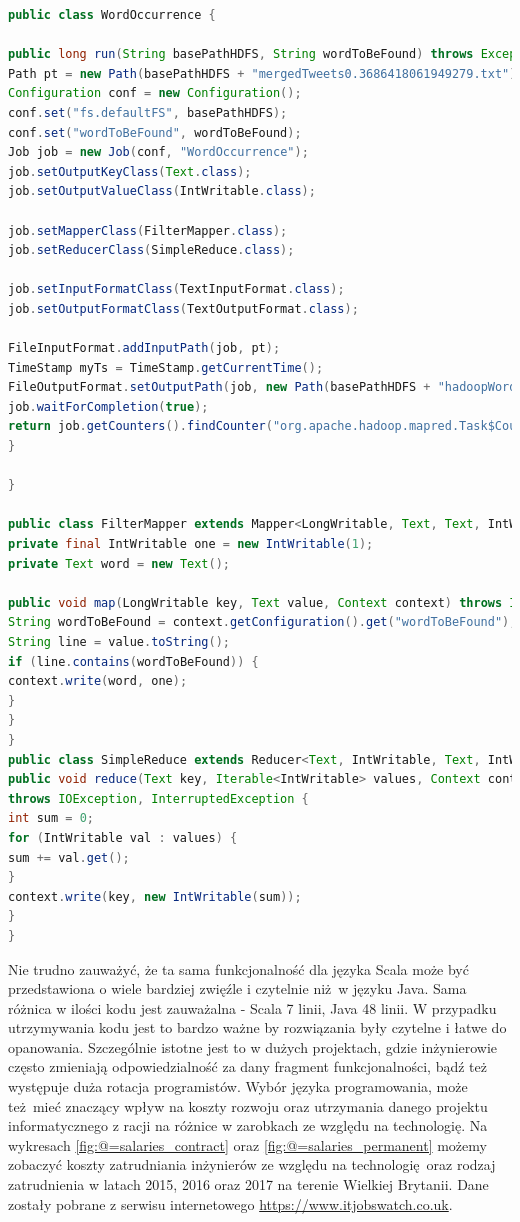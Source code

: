 \begin{lstlisting}[language=Java, caption={Operacja zliczania wystąpień danej frazy w linii dla języka Java na platformie Apache Hadoop},captionpos=b, label={lst:java-occurrence-listing}]
public class WordOccurrence {

public long run(String basePathHDFS, String wordToBeFound) throws Exception {
Path pt = new Path(basePathHDFS + "mergedTweets0.3686418061949279.txt");
Configuration conf = new Configuration();
conf.set("fs.defaultFS", basePathHDFS);
conf.set("wordToBeFound", wordToBeFound);
Job job = new Job(conf, "WordOccurrence");
job.setOutputKeyClass(Text.class);
job.setOutputValueClass(IntWritable.class);

job.setMapperClass(FilterMapper.class);
job.setReducerClass(SimpleReduce.class);

job.setInputFormatClass(TextInputFormat.class);
job.setOutputFormatClass(TextOutputFormat.class);

FileInputFormat.addInputPath(job, pt);
TimeStamp myTs = TimeStamp.getCurrentTime();
FileOutputFormat.setOutputPath(job, new Path(basePathHDFS + "hadoopWordOccurrenceResult" + myTs));
job.waitForCompletion(true);
return job.getCounters().findCounter("org.apache.hadoop.mapred.Task$Counter", "MAP_OUTPUT_RECORDS").getValue();
}

}

public class FilterMapper extends Mapper<LongWritable, Text, Text, IntWritable> {
private final IntWritable one = new IntWritable(1);
private Text word = new Text();

public void map(LongWritable key, Text value, Context context) throws IOException, InterruptedException {
String wordToBeFound = context.getConfiguration().get("wordToBeFound");
String line = value.toString();
if (line.contains(wordToBeFound)) {
context.write(word, one);
}
}
}
public class SimpleReduce extends Reducer<Text, IntWritable, Text, IntWritable> {
public void reduce(Text key, Iterable<IntWritable> values, Context context)
throws IOException, InterruptedException {
int sum = 0;
for (IntWritable val : values) {
sum += val.get();
}
context.write(key, new IntWritable(sum));
}
}
\end{lstlisting}
Nie trudno zauważyć, że ta sama funkcjonalność dla języka Scala może być przedstawiona o wiele bardziej zwięźle i czytelnie niż w języku Java. Sama różnica w ilości kodu jest zauważalna - Scala 7 linii, Java 48 linii. W przypadku utrzymywania kodu jest to bardzo ważne by rozwiązania były czytelne i łatwe do opanowania. Szczególnie istotne jest to w dużych projektach, gdzie inżynierowie często zmieniają odpowiedzialność za dany fragment funkcjonalności, bądź też występuje duża rotacja programistów. Wybór języka programowania, może też mieć znaczący wpływ na koszty rozwoju oraz utrzymania danego projektu informatycznego z racji na różnice w zarobkach ze względu na technologię. Na wykresach \ref{fig:@=salaries_contract} oraz \ref{fig:@=salaries_permanent} możemy zobaczyć koszty zatrudniania inżynierów ze względu na technologię oraz rodzaj zatrudnienia w latach 2015, 2016 oraz 2017 na terenie Wielkiej Brytanii. Dane zostały pobrane z serwisu internetowego \url{https://www.itjobswatch.co.uk}.
